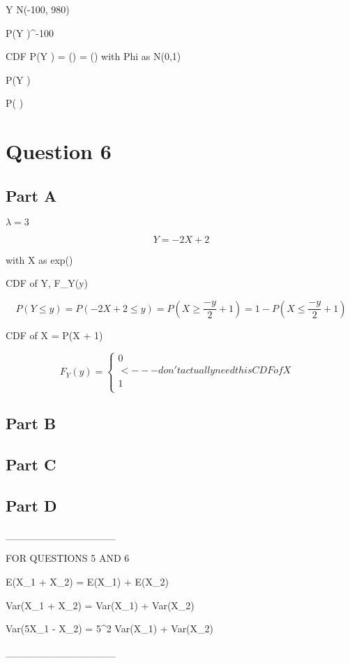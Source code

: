\documentclass[letterpaper]{article}
\begin{document}
Y \thicksim N(-100, 980)

P(Y )^-100

CDF P(Y ) = \Phi() = \Phi() with Phi as N(0,1)


P(Y )

P( \geq )

\newpage

\section*{Question 6}

\subsection*{Part A}

$\lambda = 3$

$$Y = -2X + 2$$

with X as exp(\lambda)

CDF of Y, F_Y(y)

$$P(Y \leq y) = P(-2X + 2 \leq y) = P(X \geq \frac{-y}{2} + 1) = 1 - P(X \leq \frac{-y}{2} + 1)$$

CDF of X = P(X \leq {} + 1)

$$F_Y(y) = \begin{cases}
    0           &       \\ <--- don't actually need this
    CDF of X    &       \\
    1           &       \\
\end{cases}$$

\subsection*{Part B}

\subsection*{Part C}

\subsection*{Part D}



_______________

FOR QUESTIONS 5 AND 6

E(X_1 + X_2) = E(X_1) + E(X_2)

Var(X_1 + X_2) = Var(X_1) + Var(X_2)

Var(5X_1 - X_2) = 5^2 \cdot Var(X_1) + Var(X_2)

_______________
\end{document}
